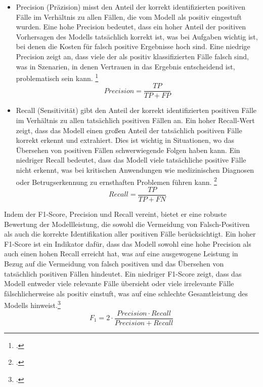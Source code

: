 \begin{itemize}
    \item Precision (Präzision) misst den Anteil der korrekt identifizierten positiven Fälle im Verhältnis zu allen Fällen, die vom Modell als positiv eingestuft wurden. Eine hohe Precision bedeutet, dass ein hoher Anteil der positiven Vorhersagen des Modells tatsächlich korrekt ist, was bei Aufgaben wichtig ist, bei denen die Kosten für falsch positive Ergebnisse hoch sind.
    Eine niedrige Precision zeigt an, dass viele der als positiv klassifizierten Fälle falsch sind, was in Szenarien, in denen Vertrauen in das Ergebnis entscheidend ist, problematisch sein kann. \footcites[Vgl.][S. 508]{naser_error_2023}
    \begin{equation}
        Precision = \frac{TP}{TP + FP}
    \end{equation}
    \item Recall (Sensitivität) gibt den Anteil der korrekt identifizierten positiven Fälle im Verhältnis zu allen tatsächlich positiven Fällen an. Ein hoher Recall-Wert zeigt, dass das Modell einen großen Anteil der tatsächlich positiven Fälle korrekt erkennt und extrahiert. Dies ist wichtig in Situationen, wo das Übersehen von positiven Fällen schwerwiegende Folgen haben kann. Ein niedriger Recall bedeutet, dass das Modell viele tatsächliche positive Fälle nicht erkennt, was bei kritischen Anwendungen wie medizinischen Diagnosen oder Betrugserkennung zu ernsthaften Problemen führen kann. \footcites[Vgl.][S. 508]{naser_error_2023}
    \begin{equation}
        Recall = \frac{TP}{TP + FN}
    \end{equation}
\end{itemize}

Indem der F1-Score, Precision und Recall vereint, bietet er eine robuste Bewertung der Modellleistung, die sowohl die Vermeidung von Falsch-Positiven als auch die korrekte Identifikation aller positiven Fälle berücksichtigt. Ein hoher F1-Score ist ein Indikator dafür, dass das Modell sowohl eine hohe Precision als auch einen hohen Recall erreicht hat, was auf eine ausgewogene Leistung in Bezug auf die Vermeidung von falsch positiven und das Übersehen von tatsächlich positiven Fällen hindeutet.
Ein niedriger F1-Score zeigt, dass das Modell entweder viele relevante Fälle übersieht oder viele irrelevante Fälle fälschlicherweise als positiv einstuft, was auf eine schlechte Gesamtleistung des Modells hinweist.\footcites[Vgl.][S. 509]{naser_error_2023}
\begin{equation}
    F_{1} = 2 \cdot \frac{Precision \cdot Recall}{Precision + Recall}
\end{equation}

